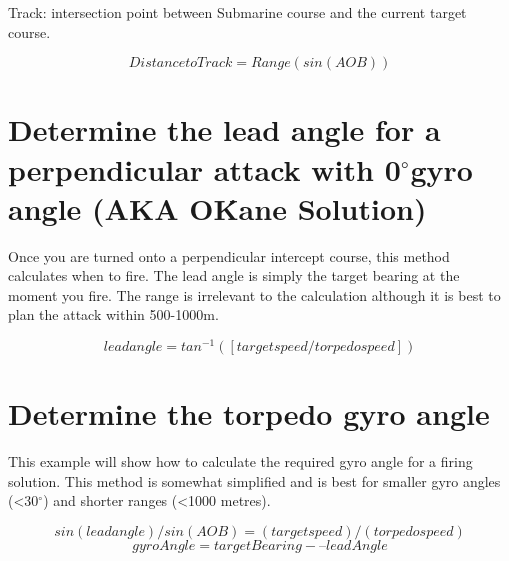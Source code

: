 \documentclass{article}
\newcommand{\degree}{$^{\circ}$}
\begin{document}
Track: intersection point between Submarine course and the current target course.

$$Distance to Track = Range \left( sin(AOB) \right)$$
%
%
%




\section{Determine the lead angle for a perpendicular attack with 0\degree gyro angle (AKA O\'Kane Solution)}

Once you are turned onto a perpendicular intercept course, this method calculates when to fire. The lead angle is simply the target bearing at the moment you fire. The range is irrelevant to the calculation although it is best to plan the attack within 500-1000m.

$$ lead angle = tan^{-1} ( [target speed / torpedo speed] ) $$

\section{Determine the torpedo gyro angle}
This example will show how to calculate the required gyro angle for a firing solution. This method is somewhat simplified and is best for smaller gyro angles (\textless 30\degree) and shorter ranges (\textless 1000 metres).

$$sin (lead angle) / sin (AOB) = (target speed) / (torpedo speed)$$
$$ gyroAngle = targetBearing -– leadAngle $$
\end{document}
